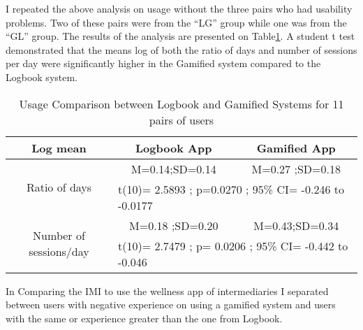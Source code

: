 I repeated the above analysis on usage without the three pairs who had usability problems. Two of these pairs were from the ``LG'' group while one was from the ``GL'' group. The results of the analysis are presented on Table\ref{table:usagewellness2}. A student t test demonstrated that the means log of both  the ratio of days and number of sessions per day were significantly higher in the Gamified system compared to the Logbook system.
\newline 
\begin{table}[h!]
  \begin{center}
    \caption{Usage Comparison between Logbook and Gamified Systems for 11 pairs of users}
    \label{table:usagewellness2}
	\begin{tabular}{|c|c|c|}
		\hline
		Log mean &Logbook App&Gamified App\\
		\hline
		 \multirow{2}{*}{Ratio of days}&M=0.14;SD=0.14&M=0.27 ;SD=0.18\\\cline{2-3} 

		 &\multicolumn{2}{|l|}{t(10)= 2.5893 ; p=0.0270 ; 95\% CI= -0.246 to -0.0177} \\
\hline
   		 \multirow{2}{*}{ Number of sessions/day}&M=0.18 ;SD=0.20&M=0.43;SD=0.34\\\cline{2-3} 
		
		 &\multicolumn{2}{|l|}{t(10)= 2.7479 ; p= 0.0206 ; 95\% CI=  -0.442 to -0.046 } \\
\hline
	\end{tabular}
  \end{center}
\end{table}
\newline  
In Comparing the IMI to use the wellness app of intermediaries I separated between users with negative experience on using a gamified system and users with the same or experience greater than the one from Logbook.
 
\begin{flushright}

\end{flushright}
